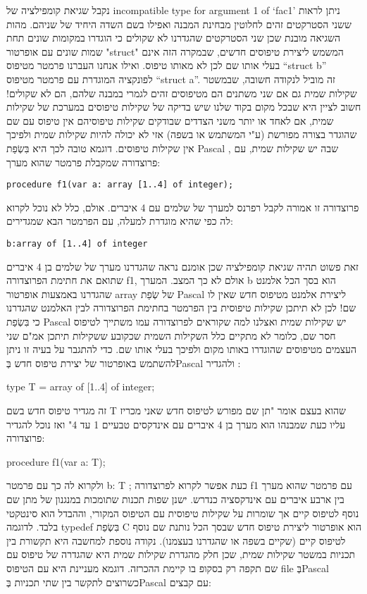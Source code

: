       נקבל שגיאת קומפילציה של incompatible type for argument 1 of `fac1'
      ניתן לראות ששני הסטרקטים זהים לחלוטין מבחינת המבנה ואפילו בשם השדה היחיד של שניהם.
      מהות השגיאה מובנת שכן שני הסטרקטים שהגדרנו לא שקולים כי הוגדרו במקומות שונים תחת שמות שונים עם אופרטור "struct" המשמש ליצירת טיפוסים חדשים, שבמקרה הזה אינם בעלי אותו שם לכן לא מאותו טיפוס. ואילו אנחנו העברנו פרמטר מטיפוס “struct b” לפונקציה המוגדרת עם פרמטר מטיפוס “struct a”. זה מוביל לנקודה חשובה, שבמשטר שקילות שמית גם אם שני משתנים הם מטיפוסים זהים לגמרי במבנה שלהם, הם לא שקולים!
      חשוב לציין היא שבכל מקום בקוד שלנו שיש בדיקה של שקילות טיפוסים במערכת של שקילות שמית, אם לאחד או יותר משני הצדדים שבודקים שקילות טיפוסיהם אין טיפוס עם שם שהוגדר בצורה מפורשת (ע"י המשתמש או בשפה) אזי לא יכולה להיות שקילות שמית ולפיכך אין שקילות טיפוסים. דוגמא טובה לכך היא בִּשְׂפַת Pascal , שבה יש שקילות שמית, עם פרוצדורה שמקבלת פרמטר שהוא מערך:

\begin{verbatim}
procedure f1(var a: array [1..4] of integer);
\end{verbatim}

      פרוצדורה זו אמורה לקבל רפרנס למערך של שלמים עם 4 איברים. אולם, כלל לא נוכל לקרוא לה כפי שהיא מוגדרת למעלה, עם הפרמטר הבא שמגדירים:

\begin{verbatim}
b:array of [1..4] of integer
\end{verbatim}

      זאת פשוט תהיה שגיאת קומפילציה שכן אומנם נראה שהגדרנו מערך של שלמים בן 4 איברים שתואם את חתימת הפרוצדורה f1, אולם לא כך המצב. המערך b הוא בסך הכל אלמנט שהגדרנו באמצעות אופרטור array של שְׂפַת Pascal ליצירת אלמנט מטיפוס חדש שאין לו שם! לכן לא תיתכן שקילות טיפוסית בין הפרמטר בחתימת הפרוצדורה לבין האלמנט שהגדרנו כי בִּשְׂפַת Pascal יש שקילות שמית ואצלנו למה שקוראים לפרוצדורה עמו משתייך לטיפוס חסר שם, כלומר לא מתקיים כלל השקילות השמית שכקובע ששקילות תיתכן אמ"ם שני העצמים מטיפוסים שהוגדרו באותו מקום ולפיכך בעלי אותו שם.
      כדי להתגבר על בעיה זו ניתן להשתמש באופרטור של יצירת טיפוס חדש בְּPascal ולהגדיר :

      type T = array of [1..4] of integer;

      זה מגדיר טיפוס חדש בשם T שהוא בעצם אומר "תן שם מפורש לטיפוס חדש שאני מכריז עליו כעת שמבנהו הוא מערך בן 4 איברים עם אינדקסים טבעיים 1 עד 4" ואז נוכל להגדיר פרוצדורה:

      procedure f1(var a: T);

      ולקרוא לה כך עם פרמטר
      b: T ;
      כעת אפשר לקרוא לפרוצדורה f1 עם פרמטר שהוא מערך בין ארבע איברים עם אינדקסציה
      כנדרש. ישנן שפות תכנות שתומכות במנגנון של מתן שם נוסף לטיפוס קיים אך שומרות על
      שקילות טיפוסית עם הטיפוס המקורי, וההבדל הוא סינטקטי בלבד. לדוגמה typedef בִּשְׂפַת C
      הוא אופרטור ליצירת טיפוס חדש שבסך הכל נותנת שם נוסף לטיפוס קיים (שקיים בשפה או
      שהגדרנו בעצמנו). נקודה נוספת למחשבה היא תקשורת בין תכניות במשטר שקילות שמית,
      שכן חלק מהגדרת שקילות שמית היא שהגדרה של טיפוס עם שם תקפה רק בסקופ בו קיימת
      ההכרזה. דוגמא מעניינת היא עם הטיפוס file בְּPascal כשרוצים לתקשר בין שתי תכניות
      בְּPascal עם קבצים:

